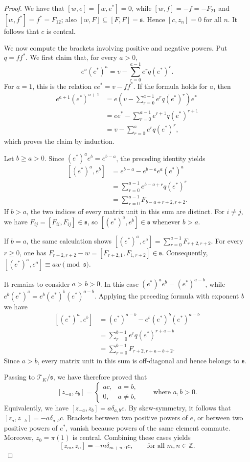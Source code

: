 \documentclass[11pt]{article}
\numberwithin{equation}{section}
\theoremstyle{plain}
\theoremstyle{definition}
\numberwithin{equation}{section}
\newcommand{\T}{\mathscr T_K}
\begin{document}
\begin{proof}
We have that $[w,e]=[w,e^*]=0$, while $[w,f]=-f=-F_{21}$ and $[w,f^*]=f^*=F_{12}$; also $[w,F]\subseteq[F,F]=\mathfrak s$. Hence $[c,z_n]=0$ for all $n$. It follows that $c$ is central.

We now compute the brackets involving positive and negative powers. Put $q=ff^*$. We first claim that, for every $a>0$,
$$
e^a(e^*)^a=v-\sum_{r=0}^{a-1}e^rq(e^*)^r.
$$
For $a=1$, this is the relation $ee^*=v-ff^*$. If the formula holds for $a$, then
$$
\begin{aligned}
e^{a+1}(e^*)^{a+1}
&=e\left(v-\sum_{r=0}^{a-1}e^rq(e^*)^r\right)e^* \\
&=ee^*-\sum_{r=0}^{a-1}e^{r+1}q(e^*)^{r+1} \\
&=v-\sum_{r=0}^{a}e^rq(e^*)^r,
\end{aligned}
$$
which proves the claim by induction.

Let $b\geq a>0$. Since $(e^*)^ae^b=e^{b-a}$, the preceding identity yields
$$
\begin{aligned}
[(e^*)^a,e^b]
&=e^{b-a}-e^{b-a}e^a(e^*)^a \\
&=\sum_{r=0}^{a-1}e^{b-a+r}q(e^*)^r \\
&=\sum_{r=0}^{a-1}F_{b-a+r+2,r+2}.
\end{aligned}
$$
If $b>a$, the two indices of every matrix unit in this sum are distinct. For $i\neq j$, we have $F_{ij}=[F_{ii},F_{ij}]\in\mathfrak s$, so $[(e^*)^a,e^b]\in\mathfrak s$ whenever $b>a$.

If $b=a$, the same calculation shows $[(e^*)^a,e^a]=\sum_{r=0}^{a-1}F_{r+2,r+2}$. For every $r\geq0$, one has $F_{r+2,r+2}-w =[F_{r+2,1},F_{1,r+2}]\in\mathfrak s$. Consequently, $[(e^*)^a,e^a]\equiv aw\pmod{\mathfrak s}$.

It remains to consider $a>b>0$. In this case $(e^*)^ae^b=(e^*)^{a-b}$, while $e^b(e^*)^a=e^b(e^*)^b(e^*)^{a-b}$. Applying the preceding formula with exponent $b$ we have
$$
\begin{aligned}
[(e^*)^a,e^b]
&=(e^*)^{a-b}-e^b(e^*)^b(e^*)^{a-b} \\
&=\sum_{r=0}^{b-1}e^rq(e^*)^{r+a-b} \\
&=\sum_{r=0}^{b-1}F_{r+2,r+a-b+2}.
\end{aligned}
$$
Since $a>b$, every matrix unit in this sum is off-diagonal and hence belongs to $\mathfrak s$.

Passing to $\T/\mathfrak s$, we have therefore proved that
$$
[z_{-a},z_b]
=
\begin{cases}
ac, & a=b,\\
0, & a\neq b,
\end{cases}
\qquad \text{where }a,b>0.
$$
Equivalently, we have $[z_{-a},z_b]=a\delta_{a,b}c$. By skew-symmetry, it follows that $[z_a,z_{-b}]=-a\delta_{a,b}c$. Brackets between two positive powers of $e$, or between two positive powers of $e^*$, vanish because powers of the same element commute. Moreover, $z_0=\pi(1)$ is central. Combining these cases yields
$$
[z_m,z_n]=-m\delta_{m+n,0}c,
\qquad\text{for all } m,n\in\mathbb Z.
$$
\end{proof}
\end{document}
